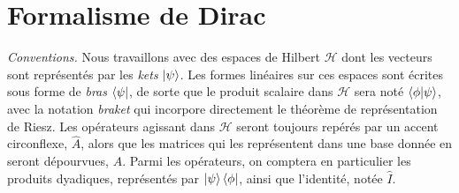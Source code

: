 \chapter{Formalisme de Dirac}

\textit{Conventions.} Nous travaillons avec des espaces de Hilbert $\mathcal H$ dont les vecteurs sont représentés par les \textit{kets} $\ket{\psi}$. Les formes linéaires sur ces espaces sont écrites sous forme de \textit{bras} $\bra{\psi}$, de sorte que le produit scalaire dans $\mathcal H$ sera noté $\braket{\phi}{\psi}$, avec la notation \textit{braket} qui incorpore directement le théorème de représentation de Riesz. Les opérateurs agissant dans $\mathcal H$ seront toujours repérés par un accent circonflexe, $\hat A$, alors que les matrices qui les représentent dans une base donnée en seront dépourvues, $A$. Parmi les opérateurs, on comptera en particulier les produits dyadiques, représentés par $\ket{\psi}\bra{\phi}$, ainsi que l'identité, notée $\hat I$.\\
$ $

